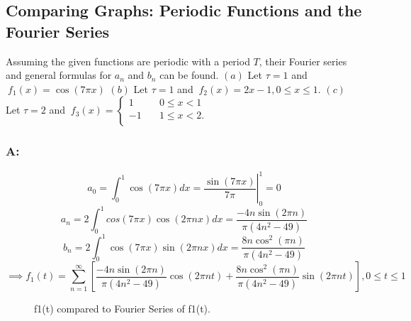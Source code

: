 \documentclass{article}
\begin{document}
\subsection{Comparing Graphs: Periodic Functions and the Fourier Series}
Assuming the given functions are periodic with a period $T$, their Fourier series and general formulas for $a_n$ and $b_n$ can be found.  
$(a)$ Let $\tau=1$ and $\ f_{1}(x)= \cos(7\pi x)$					
$(b)$ Let $\tau=1$ and $\ f_{2}(x)= 2x-1, 0 \leq x \leq 1. $
$(c)$ Let $\tau=2$ and  $\ f_{3}(x)=
	\begin{cases}
        1 & \quad 0 \leq x < 1 \\
        -1 & \quad 1 \leq x < 2. \\
        \end{cases} $

\subsubsection{A:}
\begin{equation*}
	\left.  a_{0}=\int_{0}^{1} \cos(7\pi x) dx = \frac{\sin(7\pi x)}{7\pi } \right |_{0}^{1} =0
\end{equation*}\begin{equation*}
	a_{n}=2 \int_{0}^{1} cos(7\pi x)\cos(2\pi nx) dx = \frac{-4n\sin(2\pi n)}{\pi (4n^2 - 49)}
\end{equation*}\begin{equation*}
	b_{n}=2 \int_{0}^{1} \cos(7 \pi x)\sin(2\pi nx) dx = \frac{8n\cos^2(\pi n)}{\pi(4n^2 - 49)}
\end{equation*}
\begin{equation*}
	\implies  f_1(t)=\sum_{n=1}^{\infty} [\frac{-4n\sin(2\pi n)}{\pi (4n^2 - 49)}\cos(2\pi nt)+\frac{8n\cos^2(\pi n)}{\pi(4n^2 - 49)} \sin(2\pi nt)], 0 \leq t \leq 1
\end{equation*}

\begin{figure}
    \centering
    \qquad
    \caption{f1(t) compared to Fourier Series of f1(t).}
    \label{fig:f1-a}
\end{figure}
\end{document}
